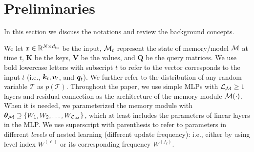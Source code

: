 \section{Preliminaries}\label{sec:prelim}
In this section we discuss the notations and  review the background concepts. 

We let $x \in \mathbb{R}^{N \times d_{\text{in}}}$ be the input, $\mathcal{M}_t$ represent the state of memory/model $\mathcal{M}$ at time $t$, $\mathbf{K}$ be the keys, $\mathbf{V}$ be the values, and $\mathbf{Q}$ be the query matrices. We use bold lowercase letters with subscript $t$ to refer to the vector corresponds to the input $t$ (i.e., $\boldsymbol{k}_t, \boldsymbol{v}_t$, and $\boldsymbol{q}_t$). We further refer to the distribution of any random variable $\mathcal{T}$ as $p(\mathcal{T})$. Throughout the paper, we use simple MLPs with $\mathcal{L}_{\mathcal{M}} \geq 1$ layers and residual connection as the architecture of the memory module $\mathcal{M}(\cdot)$. When it is needed, we parameterized the memory module with $\boldsymbol{\theta}_{\mathcal{M}} \supseteq \{W_1, W_2, \dots, W_{\mathcal{L}_{\mathcal{M}}} \}$, which at least includes the parameters of linear layers in the MLP. We use superscript with parenthesis to refer to parameters in different \emph{levels} of nested learning (different update frequency): i.e., either by using level index $W^{(\ell)}$ or its corresponding frequency $W^{(f_\ell)}$. 



